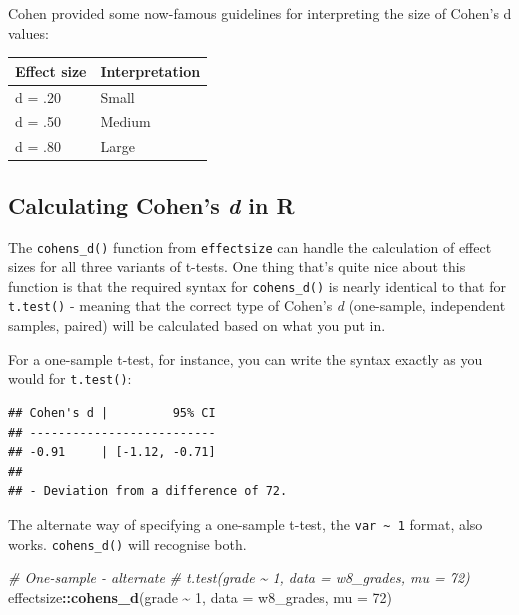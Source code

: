 \documentclass[
]{book}
\newenvironment{Shaded}{\begin{snugshade}}{\end{snugshade}}
\newcommand{\AttributeTok}[1]{\textcolor[rgb]{0.13,0.29,0.53}{#1}}
\newcommand{\CommentTok}[1]{\textcolor[rgb]{0.56,0.35,0.01}{\textit{#1}}}
\newcommand{\DecValTok}[1]{\textcolor[rgb]{0.00,0.00,0.81}{#1}}
\newcommand{\FunctionTok}[1]{\textcolor[rgb]{0.13,0.29,0.53}{\textbf{#1}}}
\newcommand{\NormalTok}[1]{#1}
\newcommand{\SpecialCharTok}[1]{\textcolor[rgb]{0.81,0.36,0.00}{\textbf{#1}}}
\begin{document}
Cohen provided some now-famous guidelines for interpreting the size of Cohen's d values:

\begin{tabular}{l|l}
\hline
Effect size & Interpretation\\
\hline
d = .20 & Small\\
\hline
d = .50 & Medium\\
\hline
d = .80 & Large\\
\hline
\end{tabular}

\subsection{\texorpdfstring{Calculating Cohen's \emph{d} in R}{Calculating Cohen's d in R}}\label{calculating-cohens-d-in-r}

The \texttt{cohens\_d()} function from \texttt{effectsize} can handle the calculation of effect sizes for all three variants of t-tests. One thing that's quite nice about this function is that the required syntax for \texttt{cohens\_d()} is nearly identical to that for \texttt{t.test()} - meaning that the correct type of Cohen's \emph{d} (one-sample, independent samples, paired) will be calculated based on what you put in.

For a one-sample t-test, for instance, you can write the syntax exactly as you would for \texttt{t.test()}:

\begin{Shaded}
\end{Shaded}

\begin{verbatim}
## Cohen's d |         95% CI
## --------------------------
## -0.91     | [-1.12, -0.71]
## 
## - Deviation from a difference of 72.
\end{verbatim}

The alternate way of specifying a one-sample t-test, the \texttt{var\ \textasciitilde{}\ 1} format, also works. \texttt{cohens\_d()} will recognise both.

\begin{Shaded}
\begin{Highlighting}[]
\CommentTok{\# One{-}sample {-} alternate}
\CommentTok{\# t.test(grade \textasciitilde{} 1, data = w8\_grades, mu = 72)}
\NormalTok{effectsize}\SpecialCharTok{::}\FunctionTok{cohens\_d}\NormalTok{(grade }\SpecialCharTok{\textasciitilde{}} \DecValTok{1}\NormalTok{, }\AttributeTok{data =}\NormalTok{ w8\_grades, }\AttributeTok{mu =} \DecValTok{72}\NormalTok{)}
\end{Highlighting}
\end{Shaded}
\end{document}
